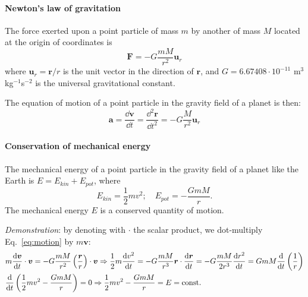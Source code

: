 \paragraph{Newton's law of gravitation}

The force exerted upon a point particle of mass $m$ by another of mass $M$ 
located at the origin of coordinates is
%
\begin{equation}
\bm F = - G \frac{mM}{r^2} \bm u_r
\end{equation}
%
where $\bm u_r = \bm r/r$ is the unit vector in the direction of $\bm r$, and
$G=6.67408\cdot 10^{-11}$ m$^3$kg$^{-1}$s$^{-2}$ is the universal 
gravitational constant.

The equation of motion of a point particle in the gravity field of a planet is
then:
%
\begin{equation}
\bm a = \frac{\dd \bm v}{\dd t} = \frac{\dd^2 \bm r}{\dd t^2} = - G\frac{M}{r^2}\bm u_r
\label{eq:motion}
\end{equation}

\paragraph{Conservation of mechanical energy}

The mechanical energy of a point particle in the gravity field of a planet 
like the Earth is $E = E_{kin}+E_{pot}$, where 
%
\begin{equation}
E_{kin}=\frac{1}{2}mv^2; \quad E_{pot} = -\frac{GmM}{r}.
\end{equation}
%
The mechanical energy $E$ is a conserved quantity of motion. 

\emph{Demonstration}: by denoting with $\cdot$ the scalar product,
we dot-multiply Eq.~\eqref{eq:motion} by $m\bm v$:
%
\begin{align}
&m\frac{\mathrm{d} \bm v}{\mathrm{d} t} \cdot \bm v 
= - G\frac{mM}{r^2}\left(\frac{\bm r}{r}\right) \cdot \bm v
\Rightarrow
\frac{1}{2}m\frac{\mathrm{d} v^2}{\mathrm{d} t}
= - G\frac{mM}{r^3}\bm r \cdot \frac{\mathrm{d} \bm r}{\mathrm{d} t} 
= - G\frac{mM}{2r^3}\frac{\mathrm{d} r^2}{\mathrm{d} t} 
= GmM\frac{\mathrm{d} }{\mathrm{d} t} \left(\frac{1}{r}\right)
\\
&\frac{\mathrm{d} }{\mathrm{d} t} \left(\frac{1}{2}mv^2 -\frac{GmM}{r}\right) = 0
\Rightarrow
\frac{1}{2}mv^2 -\frac{GmM}{r} = E = \text{const}.
\end{align}

